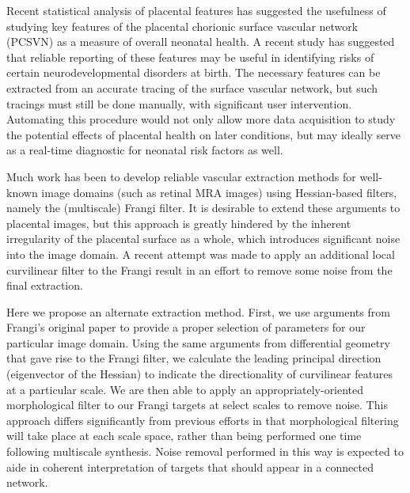

Recent statistical analysis of placental features has suggested the usefulness of studying key features of the placental chorionic surface vascular network (PCSVN) as a measure of overall neonatal health. A recent study has suggested that reliable reporting of these features may be useful in identifying risks of certain neurodevelopmental disorders at birth. The necessary features can be extracted from an accurate tracing of the surface vascular network, but such tracings must still be done manually, with significant user intervention. Automating this procedure would not only allow more data acquisition to study the potential effects of placental health on later conditions, but may ideally serve as a real-time diagnostic for neonatal risk factors as well.

Much work has been to develop reliable vascular extraction methods for well-known image domains (such as retinal MRA images) using Hessian-based filters, namely the (multiscale) Frangi filter. It is desirable to extend these arguments to placental images, but this approach is greatly hindered by the inherent irregularity of the placental surface as a whole, which introduces significant noise into the image domain.  A recent attempt was made to apply an additional local curvilinear filter to the Frangi result in an effort to remove some noise from the final extraction.

Here we propose an alternate extraction method. First, we use arguments from Frangi's original paper to provide a proper selection of parameters for our particular image domain. Using the same arguments from differential geometry that gave rise to the Frangi filter, we calculate the leading principal direction (eigenvector of the Hessian) to indicate the directionality of curvilinear features at a particular scale. We are then able to apply an appropriately-oriented morphological filter to our Frangi targets at select scales to remove noise. This approach differs significantly from previous efforts in that morphological filtering will take place at each scale space, rather than being performed one time following multiscale synthesis. Noise removal performed in this way is expected to aide in coherent interpretation of targets that should appear in a connected network.

